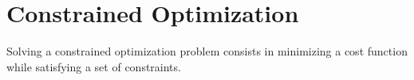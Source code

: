



\section{Constrained Optimization}

Solving a constrained optimization problem consists in minimizing a cost function while satisfying a set of constraints.

